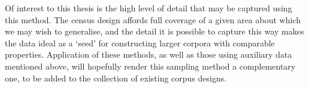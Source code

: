 Of interest to this thesis is the high level of detail that may be captured using this method.  The census design affords full coverage of a given area about which we may wish to generalise, and the detail it is possible to capture this way makes the data ideal as a `seed' for constructing larger corpora with comparable properties.  Application of these methods, as well as those using auxiliary data mentioned above, will hopefully render this sampling method a complementary one, to be added to the collection of existing corpus designs.




% 
% 
% 
% 
